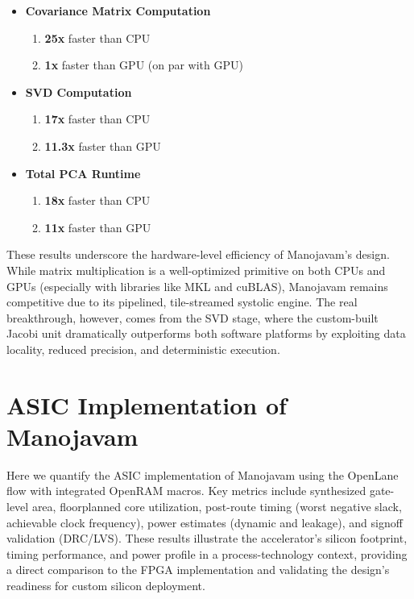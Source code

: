\begin{itemize}
	\item \textbf{Covariance Matrix Computation}
	\begin{enumerate}
		\item \textbf{25x} faster than CPU
		\item \textbf{1x} faster than GPU (on par with GPU)
	\end{enumerate}
	\item \textbf{SVD Computation}
	\begin{enumerate}
		\item \textbf{17x} faster than CPU
		\item \textbf{11.3x} faster than GPU
	\end{enumerate}
	\item \textbf{Total PCA Runtime}
	\begin{enumerate}
		\item \textbf{18x} faster than CPU
		\item \textbf{11x} faster than GPU
	\end{enumerate}
\end{itemize}

These results underscore the hardware-level efficiency of Manojavam's design. While matrix multiplication is a well-optimized primitive on both CPUs and GPUs (especially with libraries like MKL and cuBLAS), Manojavam remains competitive due to its pipelined, tile-streamed systolic engine. The real breakthrough, however, comes from the SVD stage, where the custom-built Jacobi unit dramatically outperforms both software platforms by exploiting data locality, reduced precision, and deterministic execution.

\section{ASIC Implementation of Manojavam}
Here we quantify the ASIC implementation of Manojavam using the OpenLane flow with integrated OpenRAM macros. Key metrics include synthesized gate-level area, floorplanned core utilization, post-route timing (worst negative slack, achievable clock frequency), power estimates (dynamic and leakage), and signoff validation (DRC/LVS). These results illustrate the accelerator’s silicon footprint, timing performance, and power profile in a process-technology context, providing a direct comparison to the FPGA implementation and validating the design’s readiness for custom silicon deployment.

